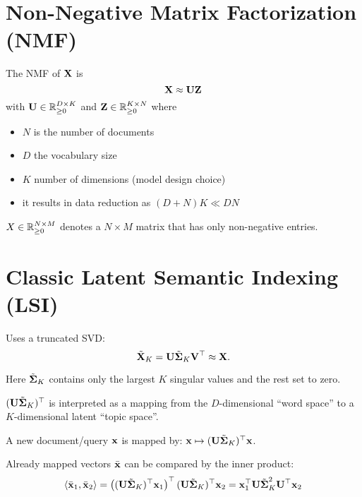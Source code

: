 \section{Non-Negative Matrix Factorization (NMF)}

\begin{definition}
The NMF of \(\boldsymbol{\mathrm{X}}\) is
\[
\boldsymbol{\mathrm{X}} \approx \boldsymbol{\mathrm{UZ}}
\]
with \(\boldsymbol{\mathrm{U}} \in \mathbb{R}_{\geq 0}^{D \times K}\) and \(\boldsymbol{\mathrm{Z}} \in \mathbb{R}_{\geq 0}^{K \times N}\) where
\begin{itemize}
\item \(N\) is the number of documents
\item \(D\) the vocabulary size
\item \(K\) number of dimensions (model design choice)
\item it results in data reduction as \((D+N)K \ll DN\)
\end{itemize}
\end{definition}

\begin{notation}
\(X \in \mathbb{R}_{\geq 0}^{N \times M}\) denotes a \(N \times M\) matrix that has only non-negative entries.
\end{notation}

\section{Classic Latent Semantic Indexing (LSI)}
Uses a truncated SVD:
\[
\tilde{\boldsymbol{\mathrm{X}}}_K = \boldsymbol{\mathrm{U}} \tilde{\boldsymbol{\mathrm{\Sigma}}}_K \boldsymbol{\mathrm{V}}^\top \approx \boldsymbol{\mathrm{X}}.
\]

Here \(\tilde{\boldsymbol{\mathrm{\Sigma}}}_K\) contains only the largest \(K\) singular values and the rest set to zero.

\((\boldsymbol{\mathrm{U}} \tilde{\boldsymbol{\mathrm{\Sigma}}}_K)^\top\) is interpreted as a mapping from the \(D\)-dimensional ``word space'' to a \(K\)-dimensional latent ``topic space''.

A new document/query \(\boldsymbol{\mathrm{x}}\) is mapped by: \( \boldsymbol{\mathrm{x}} \mapsto (\boldsymbol{\mathrm{U}} \tilde{\boldsymbol{\mathrm{\Sigma}}}_K)^\top \boldsymbol{\mathrm{x}}\).

Already mapped vectors \(\bar{\boldsymbol{\mathrm{x}}}\) can be compared by the inner product:
\[
\left\langle \bar{\boldsymbol{\mathrm{x}}}_1, \bar{\boldsymbol{\mathrm{x}}}_2 \right\rangle = \left(
(\boldsymbol{\mathrm{U}} \tilde{\boldsymbol{\mathrm{\Sigma}}}_K)^\top \boldsymbol{\mathrm{x}}_1
\right)^\top (\boldsymbol{\mathrm{U}} \tilde{\boldsymbol{\mathrm{\Sigma}}}_K)^\top \boldsymbol{\mathrm{x}}_2 = \boldsymbol{\mathrm{x}}_1^\top \boldsymbol{\mathrm{U}} \tilde{\boldsymbol{\mathrm{\Sigma}}}_K^2 \boldsymbol{\mathrm{U}}^\top \boldsymbol{\mathrm{x}}_2
\]

